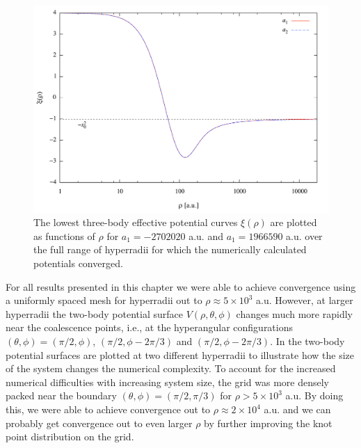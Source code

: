 \begin{figure}[h!]
	\includegraphics[width=\linewidth]{infty.pdf}
	\caption{The lowest three-body effective potential curves $\xi(\rho)$ are plotted as functions of $\rho$ for $a_1 = -2702020$ a.u. and $a_1 = 1966590$ a.u. over the full range of hyperradii for which the numerically calculated potentials converged.}
	\label{fig:infty}
\end{figure}

For all results presented in this chapter we were able to achieve convergence using a uniformly spaced mesh for hyperradii out to $\rho \approx 5 \times 10^3$ a.u. However, at larger hyperradii the two-body potential surface $V(\rho,\theta,\phi)$ changes much more rapidly near the coalescence points, i.e., at the hyperangular configurations $(\theta,\phi) = (\pi/2,\phi)$, $(\pi/2,\phi - 2\pi/3)$ and $(\pi/2,\phi - 2\pi/3)$. In  the two-body potential surfaces are plotted at two different hyperradii to illustrate how the size of the system changes the numerical complexity. To account for the increased numerical difficulties with increasing system size, the grid was more densely packed near the boundary $(\theta,\phi)=(\pi/2,\pi/3)$ for $\rho > 5 \times 10^3$ a.u. By doing this, we were able to achieve convergence out to $\rho \approx 2 \times 10^4$ a.u. and we can probably get convergence out to even larger $\rho$ by further improving the knot point distribution on the grid.

